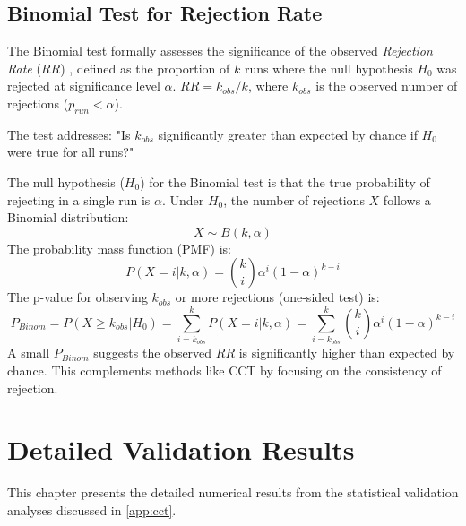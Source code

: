 \begin{appendices}
  \section{Binomial Test for Rejection Rate}
  \label{sec:binom_test_methodology} %

  The Binomial test formally assesses the significance of the observed \textit{Rejection Rate} ($RR$) \autocite{fahrmeir2016statistik}, defined as the proportion of $k$ runs where the null hypothesis $H_0$ was rejected at significance level $\alpha$. $RR = k_{obs}/k$, where $k_{obs}$ is the observed number of rejections ($p_{run} < \alpha$).

  The test addresses: "Is $k_{obs}$ significantly greater than expected by chance if $H_0$ were true for all runs?"

  The null hypothesis ($H_0$) for the Binomial test is that the true probability of rejecting in a single run is $\alpha$. Under $H_0$, the number of rejections $X$ follows a Binomial distribution:
  \begin{equation}
    X \sim B(k, \alpha) %
  \end{equation}
  The probability mass function (PMF) is:
  \begin{equation}
    P(X=i | k, \alpha) = \binom{k}{i} \alpha^i (1-\alpha)^{k-i}
    \label{eq:binom_pmf} %
  \end{equation}
  The p-value for observing $k_{obs}$ or more rejections (one-sided test) is:
  \begin{equation}
    P_{Binom} = P(X \ge k_{obs} | H_0) = \sum_{i=k_{obs}}^{k} P(X=i | k, \alpha) = \sum_{i=k_{obs}}^{k} \binom{k}{i} \alpha^i (1-\alpha)^{k-i}
    \label{eq:binom_pvalue} %
  \end{equation}
  A small $P_{Binom}$ suggests the observed $RR$ is significantly higher than expected by chance. This complements methods like CCT by focusing on the consistency of rejection.


  \chapter{Detailed Validation Results} %
  \label{app:detailed_results} %

  This chapter presents the detailed numerical results from the statistical validation analyses discussed in \autoref{app:cct}. %


\end{appendices}
